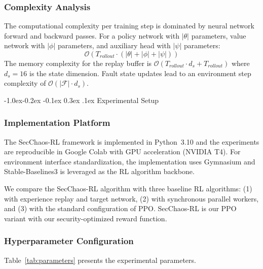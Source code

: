 \documentclass[conference,10pt]{IEEEtran}
\makeatletter
\renewcommand\subsection{\@startsection{subsection}{2}{\z@}%
	{-1.0ex\@plus -0.2ex \@minus -0.1ex}%
	{0.3ex \@plus .1ex}%
	{\normalfont\normalsize\itshape}}
\makeatother
\begin{document}
\subsubsection{Complexity Analysis}

The computational complexity per training step is dominated by neural network forward and backward passes. For a policy network with $|\theta|$ parameters, value network with $|\phi|$ parameters, and auxiliary head with $|\psi|$ parameters:
\begin{equation}
	\mathcal{O}(T_{rollout} \cdot (|\theta| + |\phi| + |\psi|))
\end{equation}
The memory complexity for the replay buffer is $\mathcal{O}(T_{rollout} \cdot d_s + T_{rollout})$ where $d_s = 16$ is the state dimension. Fault state updates lead to an environment step complexity of $\mathcal{O}(|\mathcal{F}| \cdot d_s)$.

\subsection{Experimental Setup}

\subsubsection{Implementation Platform}
The SecChaos-RL framework is implemented in Python~3.10 and the experiments are reproducible in Google Colab with GPU acceleration (NVIDIA T4). For environment interface standardization, the implementation uses Gymnasium \cite{towers2026gymnasium} and Stable-Baselines3 \cite{raffin2021stable} is leveraged as the RL algorithm backbone.

We compare the SecChaos-RL algorithm with three baseline RL algorithms: (1)  \cite{mnih2015human} with experience replay and target network, (2)  \cite{mnih2016asynchronous} with synchronous parallel workers, and (3)  \cite{schulman2017ppo} with the standard configuration of PPO. SecChaos-RL is our PPO variant with our security-optimized reward function.

\subsubsection{Hyperparameter Configuration}

Table~\ref{tab:parameters} presents the experimental parameters.
\end{document}
